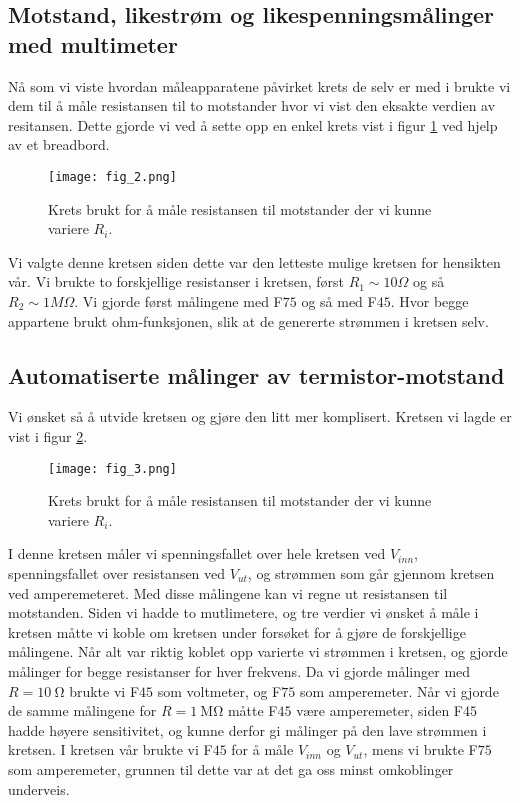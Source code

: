 \documentclass[%
 reprint,
 amsmath,amssymb,
 aps,
]{revtex4-1}
\begin{document}
\subsection{Motstand, likestrøm og likespenningsmålinger med multimeter}
Nå som vi viste hvordan måleapparatene påvirket krets de selv er med i brukte vi dem til å måle resistansen til to motstander hvor vi vist den eksakte verdien av resitansen. Dette gjorde vi ved å sette opp en enkel krets vist i figur \ref{fig2} ved hjelp av et breadbord.
\begin{figure}[h!]
    \centering
    \texttt{[image: fig\_2.png]}
    \caption{Krets brukt for å måle resistansen til motstander der vi kunne variere $R_i$.}
    \label{fig2}
\end{figure}
Vi valgte denne kretsen siden dette var den letteste mulige kretsen for hensikten vår. Vi brukte to forskjellige resistanser i kretsen, først $R_1 \sim 10 \Omega$ og så $R_2 \sim 1 M\Omega$. Vi gjorde først målingene med F$75$ og så med F$45$. Hvor begge appartene brukt ohm-funksjonen, slik at de genererte strømmen i kretsen selv.

\subsection{Automatiserte målinger av termistor-motstand}
Vi ønsket så å utvide kretsen og gjøre den litt mer komplisert. Kretsen vi lagde er vist i figur \ref{fig3}.
\begin{figure}[h!]
    \centering
    \texttt{[image: fig\_3.png]}
    \caption{Krets brukt for å måle resistansen til motstander der vi kunne variere $R_i$.}
    \label{fig3}
\end{figure}
I denne kretsen måler vi spenningsfallet over hele kretsen ved $V_{inn}$, spenningsfallet over resistansen ved $V_{ut}$, og strømmen som går gjennom kretsen ved amperemeteret. Med disse målingene kan vi regne ut resistansen til motstanden. Siden vi hadde to mutlimetere, og tre verdier vi ønsket å måle i kretsen måtte vi koble om kretsen under forsøket for å gjøre de forskjellige målingene. Når alt var riktig koblet opp varierte vi strømmen i kretsen, og gjorde målinger for begge resistanser for hver frekvens. Da vi gjorde målinger med $R=\SI{10}{\ohm}$ brukte vi F$45$ som voltmeter, og F$75$ som amperemeter. Når vi gjorde de samme målingene for $R=\SI{1}{\mega \ohm}$ måtte F$45$ være amperemeter, siden F$45$ hadde høyere sensitivitet, og kunne derfor gi målinger på den lave strømmen i kretsen. I kretsen vår brukte vi F$45$ for å måle $V_{inn}$ og $V_{ut}$, mens vi brukte F$75$ som amperemeter, grunnen til dette var at det ga oss minst omkoblinger underveis.
\end{document}
